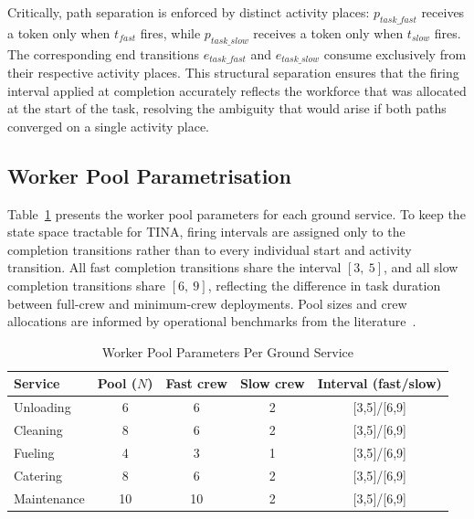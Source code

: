 \documentclass[conference]{IEEEtran}
\begin{document}
Critically, path separation is enforced by distinct activity places:
$p_{\mathit{task\_fast}}$ receives a token only when $t_{\mathit{fast}}$ fires,
while $p_{\mathit{task\_slow}}$ receives a token only when $t_{\mathit{slow}}$
fires. The corresponding end transitions $e_{\mathit{task\_fast}}$ and
$e_{\mathit{task\_slow}}$ consume exclusively from their respective activity
places. This structural separation ensures that the firing interval applied at
completion accurately reflects the workforce that was allocated at the start of
the task, resolving the ambiguity that would arise if both paths converged on a
single activity place.

\subsection{Worker Pool Parametrisation}

Table~\ref{tab:worker_params} presents the worker pool parameters for each ground
service. To keep the state space tractable for TINA, firing intervals are
assigned only to the completion transitions rather than to every individual
start and activity transition. All fast completion transitions share the
interval $[3,~5]$, and all slow completion transitions share $[6,~9]$,
reflecting the difference in task duration between full-crew and minimum-crew
deployments. Pool sizes and crew allocations are informed by operational
benchmarks from the literature~\cite{b1,b2,b3}.

\begin{table}[h!]
  \caption{Worker Pool Parameters Per Ground Service}
  \label{tab:worker_params}
  \footnotesize
  \begin{tabularx}{\columnwidth}{@{}Xcccc@{}}
    \toprule
    \textbf{Service} & \textbf{Pool ($N$)} & \textbf{Fast crew} & \textbf{Slow crew} & \textbf{Interval (fast/slow)} \\
    \midrule
    Unloading   & 6  & 6  & 2 & {[}3,5{]}/{[}6,9{]} \\
    Cleaning    & 8  & 6  & 2 & {[}3,5{]}/{[}6,9{]} \\
    Fueling     & 4  & 3  & 1 & {[}3,5{]}/{[}6,9{]} \\
    Catering    & 8  & 6  & 2 & {[}3,5{]}/{[}6,9{]} \\
    Maintenance & 10 & 10 & 2 & {[}3,5{]}/{[}6,9{]} \\
    \bottomrule
  \end{tabularx}
\end{table}
\end{document}
